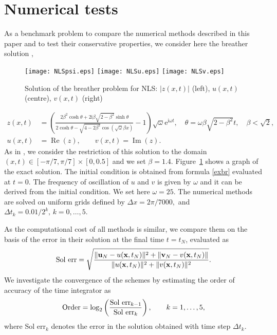 \documentclass[twoside]{article}
\numberwithin{equation}{section}
\begin{document}
\section{Numerical tests}\label{testsec}
As a benchmark problem to compare the numerical methods described in this paper and to test their conservative properties, we consider here the breather solution \cite{AEK},
\begin{figure}[tbp]
\begin{center}
\texttt{[image: NLSpsi.eps]}
\texttt{[image: NLSu.eps]}
\texttt{[image: NLSv.eps]}
\end{center}
	\caption{Solution of the breather problem for NLS: $|z(x,t)|$ (left), $u(x,t)$ (centre), $v(x,t)$ (right)}
	\label{fig:NLSbr}
\end{figure} 
\begin{align}\label{exbr}
z(x,t)&=\left(\frac{2\beta^2\cosh\theta+2\mathrm{i}\beta\sqrt{2-\beta^2}\sinh\theta}{2\cosh\theta-\sqrt{4-2\beta^2}\cos(\sqrt\omega\beta x)}-1\right)\sqrt\omega\mathrm{e}^{\mathrm{i}\omega t},\quad \theta=\omega\beta\sqrt{2-\beta^2}t,\quad\beta<\sqrt{2},\\\nonumber
u(x,t)&=\operatorname{Re}(z),\qquad v(x,t)=\operatorname{Im}(z). 
\end{align}
As in \cite{CFC}, we consider the restriction of this solution to the domain $(x,t)\in [-\pi/7,\pi/7]\times[0,0.5]$ and we set $\beta=1.4$. Figure~\ref{fig:NLSbr} shows a graph of the exact solution. The initial condition is obtained from formula \eqref{exbr} evaluated at $t=0$. The frequency of oscillation of $u$ and $v$ is given by $\omega$ and it can be derived from the initial condition.  We set here $\omega=25$. The numerical methods are solved on uniform grids defined by $\Delta x = 2\pi/7000,$ and $\Delta t_k = 0.01/2^k,\, k = 0, \ldots , 5$.

As the computational cost of all methods is similar, we compare them on the basis of the error in their solution at the final time $t=t_N$, evaluated as
$${\rm Sol\,\, err}=\sqrt{\frac{\|\mathbf{u}_N-u(\mathbf{x},t_N)\|^2+\|\mathbf{v}_N-v(\mathbf{x},t_N)\|}{\|u(\mathbf{x},t_N)\|^2+\|v(\mathbf{x},t_N)\|^2}}.$$
We investigate the convergence of the schemes by estimating the order of accuracy of the time integrator as
$${\rm Order}=\log_2\left(\frac{{\rm Sol\,\, err}_{{k-1}}}{{\rm Sol\,\, err}_k}\right),\qquad k=1,\ldots, 5,$$
where Sol err$_k$ denotes the error in the solution obtained with time step $\Delta t_k$. 
\end{document}
